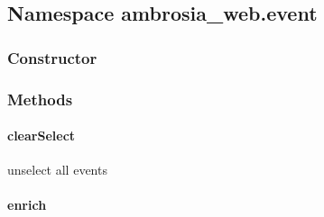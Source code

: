 \documentclass[letterpaper,10pt,english]{sphinxmanual}
\begin{document}
\begin{fulllineitems}
\label{ambrosia_web.entity.entities-Task:ambrosia_web.entity.entities-Task}
\end{fulllineitems}



\subsection{Namespace ambrosia\_web.event}
\label{ambrosia_web.event::doc}\label{ambrosia_web.event:namespace-ambrosia-web-event}

\subsubsection{Constructor}
\label{ambrosia_web.event:constructor}

\begin{fulllineitems}
\label{ambrosia_web.event:ambrosia_web.event}
\end{fulllineitems}



\subsubsection{Methods}
\label{ambrosia_web.event:methods}

\paragraph{clearSelect}
\label{ambrosia_web.event:clearselect}

\begin{fulllineitems}
\label{ambrosia_web.event:ambrosia_web.event.clearSelect}
\end{fulllineitems}


unselect all events


\paragraph{enrich}
\label{ambrosia_web.event:enrich}
\end{document}
